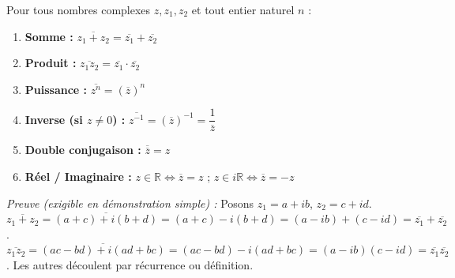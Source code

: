 \documentclass[11pt]{article}
\begin{document}
\begin{propriete}
Pour tous nombres complexes $z, z_1, z_2$ et tout entier naturel $n$ :
\begin{enumerate}
    \item \textbf{Somme :} $\overline{z_1 + z_2} = \overline{z_1} + \overline{z_2}$
    \item \textbf{Produit :} $\overline{z_1 z_2} = \overline{z_1} \cdot \overline{z_2}$
    \item \textbf{Puissance :} $\overline{z^n} = (\overline{z})^n$
    \item \textbf{Inverse (si $z \neq 0$) :} $\overline{z^{-1}} = (\overline{z})^{-1} = \dfrac{1}{\overline{z}}$
    \item \textbf{Double conjugaison :} $\overline{\overline{z}} = z$
    \item \textbf{Réel / Imaginaire :} $z \in \mathbb{R} \iff \overline{z} = z$ \quad ; \quad $z \in i\mathbb{R} \iff \overline{z} = -z$
\end{enumerate}
\textit{Preuve (exigible en démonstration simple) :} Posons $z_1 = a+ib$, $z_2 = c+id$.
$\overline{z_1+z_2} = \overline{(a+c)+i(b+d)} = (a+c)-i(b+d) = (a-ib)+(c-id) = \overline{z_1}+\overline{z_2}$.
$\overline{z_1 z_2} = \overline{(ac-bd)+i(ad+bc)} = (ac-bd)-i(ad+bc) = (a-ib)(c-id) = \overline{z_1}\overline{z_2}$.
Les autres découlent par récurrence ou définition.
\end{propriete}
\end{document}
